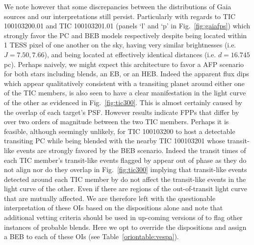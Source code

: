 We note however that some discrepancies between the distributions of Gaia sources and our \vespa{}
interpretations still persist. Particularly with regards to TIC 100103200.01 and TIC 100103201.01 (panels `l'
and `p' in Fig.~\ref{fig:gaiafps}) which strongly favor the PC and BEB models respectively despite being
located within 1 TESS pixel of one another on the sky, having very
similar brightnesses (i.e. $J=7.50, 7.66$), and being located at effectively identical distances (i.e.
$d=16.745$ pc). %
Perhaps naively, we might expect this architecture to favor a AFP scenario for
both stars including blends, an EB, or an HEB. Indeed the apparent flux dips which appear qualitatively
consistent with a transiting planet around either one of the TIC members, is also seen to have a clear manifestation
in the light curve of the other as evidenced in Fig.~\ref{fig:tic300}. This is almost certainly caused by the
overlap of each target's PSF.
However \vespa{} results indicate FPPs that differ by over two orders of magnitude between the two TIC members.
Perhaps it is feasible, although seemingly unlikely, for TIC 100103200 to host a detectable transiting
PC while being blended with the nearby TIC 100103201 whose transit-like events are strongly favored by the
BEB scenario. Indeed the transit times of each TIC member's transit-like events flagged by \pipeline{} appear out of
phase as they do not align nor do they overlap in Fig.~\ref{fig:tic300} implying that transit-like events detected
around each TIC member by \pipeline{} do not affect the transit-like events in the light curve of the other. Even if
there are regions of the out-of-transit light curve that are mutually affected.
We are therefore left with the questionable interpretation
of these OIs based on the \vespa{} dispositions alone and note that additional vetting criteria should be used in
up-coming versions of \pipeline{} to flag other instances of probable blends. Here we opt to override the \vespa{}
dispositions and assign a BEB to each of these OIs (see Table~\ref{oriontable:vespa}). \\

